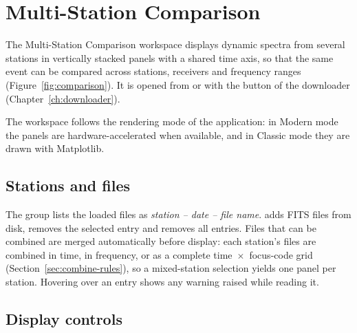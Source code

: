 \chapter{Multi-Station Comparison}
\label{ch:comparison}

The Multi-Station Comparison workspace displays dynamic spectra from several stations in
vertically stacked panels with a shared time axis, so that the same event can be compared
across stations, receivers and frequency ranges (Figure~\ref{fig:comparison}). It is opened
from  or with the  button of the
downloader (Chapter~\ref{ch:downloader}).


The workspace follows the rendering mode of the application: in Modern mode the panels are
hardware-accelerated when available, and in Classic mode they are drawn with Matplotlib.

\section{Stations and files}

The  group lists the loaded files as \emph{station -- date -- file
name}.  adds FITS files from disk,  removes the selected entry
and  removes all entries. Files that can be combined are merged automatically
before display: each station's files are combined in time, in frequency, or as a complete
time~\(\times\)~focus-code grid (Section~\ref{sec:combine-rules}), so a mixed-station
selection yields one panel per station. Hovering over an entry shows any warning raised
while reading it.

\section{Display controls}


